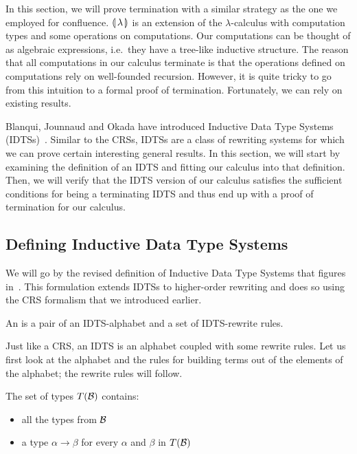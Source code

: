 In this section, we will prove termination with a similar strategy as the
one we employed for confluence. $\llparenthesis \, \lambda \, \rrparenthesis$ is an extension of the
$\lambda$-calculus with computation types and some operations on
computations. Our computations can be thought of as algebraic expressions,
i.e.\ they have a tree-like inductive structure. The reason that all
computations in our calculus terminate is that the operations defined on
computations rely on well-founded recursion. However, it is quite tricky to
go from this intuition to a formal proof of termination. Fortunately, we
can rely on existing results.

Blanqui, Jounnaud and Okada have introduced Inductive Data Type Systems
(IDTSs)~\cite{blanqui2002inductive,blanqui2000termination}. Similar to the
CRSs, IDTSs are a class of rewriting systems for which we can prove certain
interesting general results. In this section, we will start by examining
the definition of an IDTS and fitting our calculus into that
definition. Then, we will verify that the IDTS version of our calculus
satisfies the sufficient conditions for being a terminating IDTS and thus
end up with a proof of termination for our calculus.

\subsection{Defining Inductive Data Type Systems}
\label{ssec:defining-idtss}

We will go by the revised definition of Inductive Data Type Systems that
figures in~\cite{blanqui2000termination}. This formulation extends IDTSs to
higher-order rewriting and does so using the CRS formalism that we
introduced earlier.

\begin{definition}
  An  is a pair of an IDTS-alphabet
  and a set of IDTS-rewrite rules.
\end{definition}

Just like a CRS, an IDTS is an alphabet coupled with some rewrite
rules. Let us first look at the alphabet and the rules for building terms
out of the elements of the alphabet; the rewrite rules will follow.

\begin{definition}
  The set of types $T(\mathcal{B})$ contains:
  \begin{itemize}
  \item all the types from $\mathcal{B}$
  \item a type $\alpha \to \beta$ for every $\alpha$ and $\beta$ in $T(\mathcal{B})$
  \end{itemize}
\end{definition}


